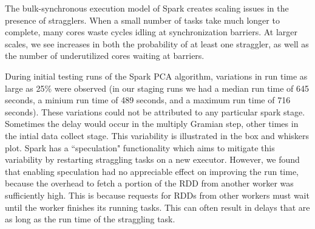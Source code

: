 The bulk-synchronous execution model of Spark creates scaling issues in the presence of stragglers. When a small number of tasks take much longer to complete, many cores waste cycles idling at synchronization barriers. At larger scales, we see increases in both the probability of at least one straggler, as well as the number of underutilized cores waiting at barriers.

During initial testing runs of the Spark PCA algorithm, variations in run time as large as 25\% were observed (in our staging runs we had a median run time of 645 seconds, a minium run time of 489 seconds, and a maximum run time of 716 seconds). These variations could not be attributed to any particular spark stage. Sometimes the delay would occur in the multiply Gramian step, other times in the intial data collect stage. This variability is illustrated in the box and whiskers plot. Spark has a ``speculation" functionality which aims to mitigate this variability by restarting straggling tasks on a new executor. However, we found that enabling speculation had no appreciable effect on improving the run time, because the overhead to fetch a portion of the RDD from another worker was sufficiently high. This is because requests for RDDs from other workers must wait until the worker finishes its running tasks. This can often result in delays that are as long as the run time of the straggling task.  

